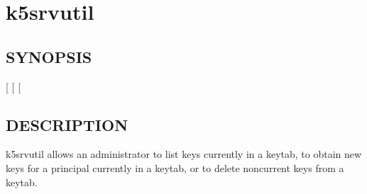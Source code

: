 \documentclass[letterpaper,10pt,english]{sphinxmanual}
\begin{document}
\section{k5srvutil}
\label{\detokenize{admin/admin_commands/k5srvutil:k5srvutil}}\label{\detokenize{admin/admin_commands/k5srvutil:k5srvutil-1}}\label{\detokenize{admin/admin_commands/k5srvutil::doc}}

\subsection{SYNOPSIS}
\label{\detokenize{admin/admin_commands/k5srvutil:synopsis}}
\sphinxAtStartPar
{} 
{[}\sphinxstylestrong{\sphinxhyphen{}i}{]}
{[} \sphinxstyleemphasis{filename}{]}
{[} \sphinxstyleemphasis{keysalts}{]}


\subsection{DESCRIPTION}
\label{\detokenize{admin/admin_commands/k5srvutil:description}}
\sphinxAtStartPar
k5srvutil allows an administrator to list keys currently in
a keytab, to obtain new keys for a principal currently in a keytab,
or to delete non\sphinxhyphen{}current keys from a keytab.
\end{document}
